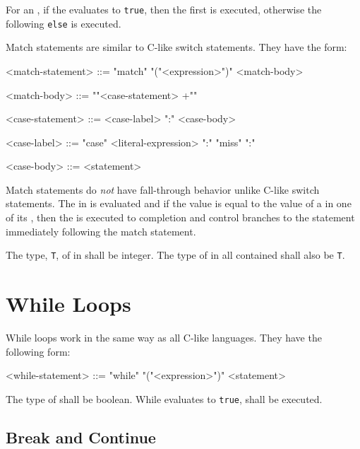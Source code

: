 For an , if the  evaluates to \texttt{true}, then the first  is executed, otherwise the  following \texttt{else} is executed.

Match statements are similar to C-like switch statements. They have the form:

\begin{minip}
\begin{grammar}
<match-statement> ::= "match" "("<expression>")" <match-body>

<match-body> ::= "{"<case-statement> +"}"

<case-statement> ::= <case-label> ":" <case-body>

<case-label> ::= 
"case" <literal-expression> ":"
\alt "miss" ":"

<case-body> ::= <statement> 
\end{grammar}
\end{minip}

Match statements do \textit{not} have fall-through behavior unlike C-like switch statements. The  in  is evaluated and if the value is equal to the value of a  in one of its , then the  is executed to completion and control branches to the statement immediately following the match statement.

The type, \texttt{T}, of  in  shall be integer. The type of  in all contained  shall also be \texttt{T}.

\section{While Loops} \label{guide:while_stmt}

While loops work in the same way as all C-like languages. They have the following form:

\begin{minip}
\begin{grammar}
<while-statement> ::= "while" "("<expression>")" <statement>
\end{grammar}
\end{minip}

The type of  shall be boolean. While  evaluates to \texttt{true},  shall be executed. 

\subsection{Break and Continue} \label{guide:break_continue}

